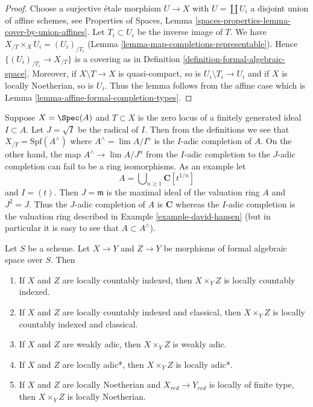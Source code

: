 \begin{proof}
Choose a surjective \'etale morphism $U \to X$ with $U = \coprod U_i$
a disjoint union of affine schemes, see Properties of Spaces, Lemma
\ref{spaces-properties-lemma-cover-by-union-affines}.
Let $T_i \subset U_i$ be the inverse image of $T$.
We have $X_{/T} \times_X U_i = (U_i)_{/T_i}$
(Lemma \ref{lemma-map-completions-representable}).
Hence $\{(U_i)_{/T_i} \to X_{/T}\}$ is a covering as in
Definition \ref{definition-formal-algebraic-space}.
Moreover, if $X \setminus T \to X$ is quasi-compact, so is
$U_i \setminus T_i \to U_i$ and if $X$ is locally Noetherian, so is
$U_i$. Thus the lemma follows from the affine case which is
Lemma \ref{lemma-affine-formal-completion-types}.
\end{proof}

\begin{remark}[Warning]
\label{remark-warning-completion}
Suppose $X = \Spec(A)$ and $T \subset X$ is the zero locus of a
finitely generated ideal $I \subset A$. Let $J = \sqrt{I}$ be
the radical of $I$. Then from the definitions we see that
$X_{/T} = \text{Spf}(A^\wedge)$ where $A^\wedge = \lim A/I^n$ is
the $I$-adic completion of $A$. On the other hand, the map
$A^\wedge \to \lim A/J^n$ from the $I$-adic completion to
the $J$-adic completion can fail to be a ring isomorphisms.
As an example let
$$
A = \bigcup\nolimits_{n \geq 1} \mathbf{C}[t^{1/n}]
$$
and $I = (t)$. Then $J = \mathfrak m$ is the maximal ideal
of the valuation ring $A$ and $J^2 = J$. Thus the $J$-adic completion
of $A$ is $\mathbf{C}$ whereas the $I$-adic completion
is the valuation ring described in Example \ref{example-david-hansen}
(but in particular it is easy to see that $A \subset A^\wedge$).
\end{remark}

\begin{lemma}
\label{lemma-types-fibre-products}
Let $S$ be a scheme. Let $X \to Y$ and $Z \to Y$ be
morphisms of formal algebraic space over $S$. Then
\begin{enumerate}
\item If $X$ and $Z$ are locally countably indexed, then $X \times_Y Z$
is locally countably indexed.
\item If $X$ and $Z$ are locally countably indexed and classical,
then $X \times_Y Z$ is locally countably indexed and classical.
\item If $X$ and $Z$ are weakly adic, then $X \times_Y Z$
is weakly adic.
\item If $X$ and $Z$ are locally adic*, then $X \times_Y Z$ is
locally adic*.
\item If $X$ and $Z$ are locally Noetherian and $X_{red} \to Y_{red}$
is locally of finite type, then $X \times_Y Z$ is locally Noetherian.
\end{enumerate}
\end{lemma}

